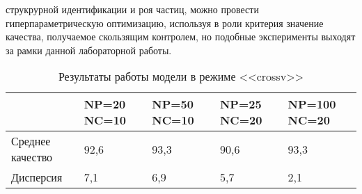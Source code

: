 струкрурной идентификации и роя частиц, можно провести гиперпараметрическую оптимизацию,
используя в роли критерия значение качества, получаемое скользящим контролем, но
подобные эксперименты выходят за рамки данной лабораторной работы.
  \begin{table}[h]
    \begin{tabular}{| l | l | l | l | l |}
      \hline
      & NP=20 NC=10 & NP=50 NC=10  & NP=25 NC=20 & NP=100 NC=20 \\ \hline
    Среднее качество & 92,6  & 93,3 & 90,6 & 93,3 \\ \hline
    Дисперсия        & 7,1   &  6,9 &  5,7 &  2,1 \\ \hline
    \end{tabular}
    \caption{Результаты работы модели в режиме <<crossv>>}
    \label{table:crossv}
  \end{table}
\newpage
